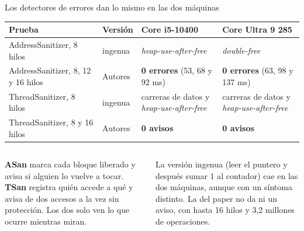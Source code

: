 \begin{frame}{Los detectores de errores dan lo mismo en las dos máquinas}
  \footnotesize
  \begin{tabularx}{\linewidth}{@{}p{43mm}p{21mm}LL@{}}
    \toprule
    \textbf{Prueba} & \textbf{Versión} & \textbf{Core i5-10400} & \textbf{Core Ultra 9 285}\\
    \midrule
    AddressSanitizer, 8 hilos & ingenua & \textit{heap-use-after-free} & \textit{double-free}\\
    AddressSanitizer, 8, 12 y 16 hilos & Autores & \textbf{0 errores} (53, 68 y 92 ms) & \textbf{0 errores} (63, 98 y 137 ms)\\
    ThreadSanitizer, 8 hilos & ingenua & carreras de datos y \textit{heap-use-after-free} & carreras de datos y \textit{heap-use-after-free}\\
    ThreadSanitizer, 8 y 16 hilos & Autores & \textbf{0 avisos} & \textbf{0 avisos}\\
    \bottomrule
  \end{tabularx}
  \vspace{2mm}
  \begin{columns}[T,onlytextwidth]
    \begin{porque}
      \textbf{ASan} marca cada bloque liberado y avisa si alguien lo vuelve a tocar. \textbf{TSan} registra quién accede a qué y avisa de dos accesos a la vez sin protección. Los dos solo ven lo que ocurre mientras miran.
    \end{porque}
    \begin{idea}\footnotesize La versión ingenua (leer el puntero y después sumar 1 al contador) cae en las dos máquinas, aunque con un síntoma distinto. La del paper no da ni un aviso, con hasta 16 hilos y 3,2 millones de operaciones.\end{idea}
  \end{columns}
\end{frame}

